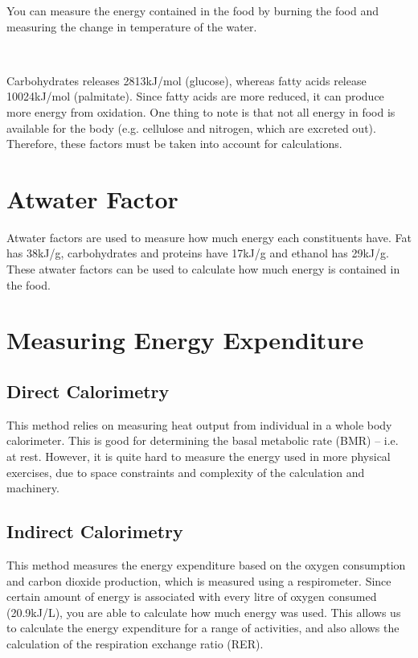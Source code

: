 \documentclass[a4paper, 12pt]{report}
\begin{document}
You can measure the energy contained in the food by burning the food and measuring the change in temperature of the water.

\begin{center}
\\
\end{center}

Carbohydrates releases 2813kJ/mol (glucose), whereas fatty acids release 10024kJ/mol (palmitate).
Since fatty acids are more reduced, it can produce more energy from oxidation.
One thing to note is that not all energy in food is available for the body (e.g. cellulose and nitrogen, which are excreted out).
Therefore, these factors must be taken into account for calculations.

\section{Atwater Factor}

Atwater factors are used to measure how much energy each constituents have.
Fat has 38kJ/g, carbohydrates and proteins have 17kJ/g and ethanol has 29kJ/g.
These atwater factors can be used to calculate how much energy is contained in the food.

\section{Measuring Energy Expenditure}

\subsection{Direct Calorimetry}

This method relies on measuring heat output from individual in a whole body calorimeter.
This is good for determining the basal metabolic rate (BMR) -- i.e. at rest.
However, it is quite hard to measure the energy used in more physical exercises, due to space constraints and complexity of the calculation and machinery.

\subsection{Indirect Calorimetry}

This method measures the energy expenditure based on the oxygen consumption and carbon dioxide production, which is measured using a respirometer.
Since certain amount of energy is associated with every litre of oxygen consumed (20.9kJ/L), you are able to calculate how much energy was used.
This allows us to calculate the energy expenditure for a range of activities, and also allows the calculation of the respiration exchange ratio (RER).
\end{document}
